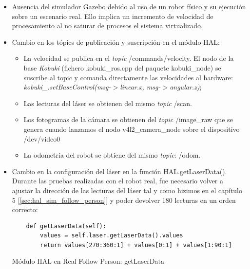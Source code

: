 \begin{itemize}
	\item Ausencia del simulador Gazebo debido al uso de un robot físico y su ejecución sobre un escenario real. Ello implica un incremento de velocidad de procesamiento al no saturar de procesos el sistema virtualizado.
	\item Cambio en los tópics de publicación y suscripción en el módulo HAL:
	\begin{itemize}
		\item La velocidad se publica en el \textit{topic} /commands/velocity. El nodo de la base \textit{Kobuki} (fichero kobuki\_ros.cpp del paquete kobuki\_node) se suscribe al topic y comanda directamente las velocidades al hardware: \textit{kobuki\_.setBaseControl(msg-$>$linear.x, msg-$>$angular.z)};
		\item Las lecturas del láser se obtienen del mismo \textit{topic} /scan.
		\item Los fotogramas de la cámara se obtienen del \textit{topic} /image\_raw que se genera cuando lanzamos el nodo v4l2\_camera\_node sobre el dispositivo /dev/video0
		\item La odometría del robot se obtiene del mismo \textit{topic}: /odom.
	\end{itemize}
	\item Cambio en la configuración del láser en la función HAL.getLaserData(). Durante las pruebas realizadas con el robot real, fue necesario volver a ajustar la dirección de las lecturas del láser tal y como hizimos en el capítulo 5 [\ref{sec:hal_sim_follow_person}] y poder devolver 180 lecturas en un orden correcto:
	\begin{code}[H]
	\begin{lstlisting}
	def getLaserData(self):
		values = self.laser.getLaserData().values
		return values[270:360:1] + values[0:1] + values[1:90:1]
	\end{lstlisting}
	\caption{Módulo HAL en Real Follow Person: getLaserData}
	\label{cod:real_follow_person_hal_laser}
	\end{code}
\end{itemize}

